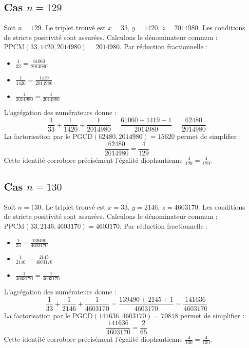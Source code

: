 \documentclass[11pt,a4paper]{article}
\begin{document}
\subsection{Cas $n = 129$}
Soit $n = 129$. Le triplet trouvé est $x = 33$, $y = 1420$, $z = 2014980$.
Les conditions de stricte positivité sont assurées.
Calculons le dénominateur commun : $\text{PPCM}(33, 1420, 2014980) = 2014980$.
Par réduction fractionnelle :
\begin{itemize}
    \item $\frac{1}{33} = \frac{61060}{2014980}$
    \item $\frac{1}{1420} = \frac{1419}{2014980}$
    \item $\frac{1}{2014980} = \frac{1}{2014980}$
\end{itemize}
L'agrégation des numérateurs donne :
$$ \frac{1}{33} + \frac{1}{1420} + \frac{1}{2014980} = \frac{61060 + 1419 + 1}{2014980} = \frac{62480}{2014980} $$
La factorisation par le $\text{PGCD}(62480, 2014980) = 15620$ permet de simplifier :
$$ \frac{62480}{2014980} = \frac{4}{129} $$
Cette identité corrobore précisément l'égalité diophantienne $\frac{4}{129} = \frac{4}{129}$.

\subsection{Cas $n = 130$}
Soit $n = 130$. Le triplet trouvé est $x = 33$, $y = 2146$, $z = 4603170$.
Les conditions de stricte positivité sont assurées.
Calculons le dénominateur commun : $\text{PPCM}(33, 2146, 4603170) = 4603170$.
Par réduction fractionnelle :
\begin{itemize}
    \item $\frac{1}{33} = \frac{139490}{4603170}$
    \item $\frac{1}{2146} = \frac{2145}{4603170}$
    \item $\frac{1}{4603170} = \frac{1}{4603170}$
\end{itemize}
L'agrégation des numérateurs donne :
$$ \frac{1}{33} + \frac{1}{2146} + \frac{1}{4603170} = \frac{139490 + 2145 + 1}{4603170} = \frac{141636}{4603170} $$
La factorisation par le $\text{PGCD}(141636, 4603170) = 70818$ permet de simplifier :
$$ \frac{141636}{4603170} = \frac{2}{65} $$
Cette identité corrobore précisément l'égalité diophantienne $\frac{4}{130} = \frac{4}{130}$.
\end{document}
